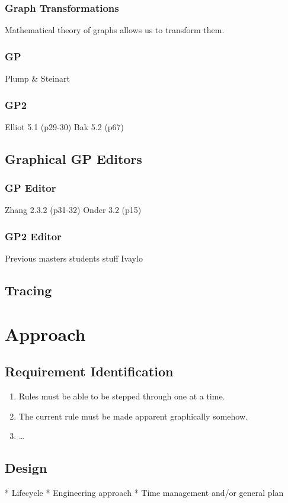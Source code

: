 \documentclass{UoYCSproject}
\begin{document}
\subsection{Graph Transformations}
Mathematical theory of graphs allows us to transform them.
\subsection{GP}
Plump \& Steinart
\subsection{GP2}
Elliot 5.1 (p29-30)
Bak 5.2 (p67)
\section{Graphical GP Editors}

\subsection{GP Editor}
Zhang 2.3.2 (p31-32)
Onder 3.2 (p15)
\subsection{GP2 Editor}
Previous masters students stuff
Ivaylo
\section{Tracing}

\chapter{Approach}
\section{Requirement Identification}
\begin{enumerate}
	\item Rules must be able to be stepped through one at a time.
 	\item The current rule must be made apparent graphically somehow.
	\item \ldots
\end{enumerate}
\section{Design}
 * Lifecycle
 * Engineering approach
 * Time management and/or general plan
 
\end{document}
